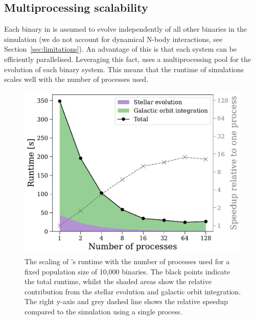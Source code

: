 \documentclass[twocolumn, twocolappendix, oneside, linenumbers]{aastex631}
\begin{document}
\subsection{Multiprocessing scalability}\label{sec:runtime}

Each binary in \cogsworth is assumed to evolve independently of all other binaries in the simulation (we do not account for dynamical N-body interactions, see Section~\ref{sec:limitations}). An advantage of this is that each system can be efficiently parallelised. Leveraging this fact, \cogsworth uses a multiprocessing pool for the evolution of each binary system. This means that the runtime of simulations scales well with the number of processes used.

\begin{figure}
    \centering
    \includegraphics[width=\columnwidth]{figures/runtime_10000.pdf}
    \caption{The scaling of \cogsworth's runtime with the number of processes used for a fixed population size of 10,000 binaries. The black points indicate the total runtime, whilst the shaded areas show the relative contribution from the stellar evolution and galactic orbit integration. The right y-axis and grey dashed line shows the relative speedup compared to the simulation using a single process.}
    \label{fig:runtime-scaling}
\end{figure}

\end{document}
